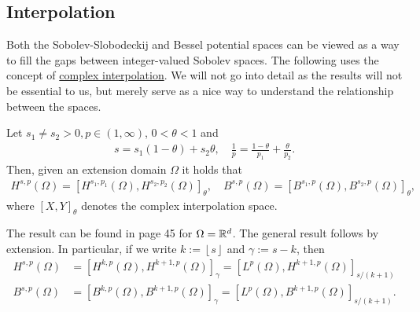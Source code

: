 \documentclass[
    a4paper,
    DIV=14,
    abstract=true,
    numbers=noenddot
]{scrartcl}
\begin{document}
\subsection{Interpolation}
Both the Sobolev-Slobodeckij and Bessel potential spaces can be viewed as a way to fill the gaps between integer-valued Sobolev spaces. The following uses the concept of \href{https://en.wikipedia.org/wiki/Interpolation_space}{complex interpolation}. We will not go into detail as the results will not be essential to us, but merely serve as a nice way to understand the relationship between the spaces.
\begin{proposition}[Interpolation ]\label{interpolation}
    Let $s_1 \neq s_2 >0, p \in (1, \infty)$, $0<\theta<1$ and
    \begin{align*}
        s=s_1(1-\theta)+s_2 \theta, \quad \frac{1}{p}=\frac{1-\theta}{p_1}+\frac{\theta}{p_2}.
    \end{align*}
    Then, given an extension domain $\Omega$  it holds that
    \begin{align*}
        H^{s,p}(\Omega )=\left[H^{s_1,p_1}(\Omega), H^{s_2,p_2}(\Omega)\right]_{\theta},\quad B^{s,p}(\Omega )=\left[B^{s_1,p}(\Omega ), B^{s_2, p}(\Omega )\right]_\theta,
    \end{align*}
    where $[X,Y]_\theta$ denotes the complex interpolation space.
\end{proposition}
The result can be found in \cite{triebel1992theory} page 45 for $\Omega = \mathbb{R}^d$. The general result follows by extension. In particular, if we write $k:=\left\lfloor s \right\rfloor$ and $\gamma:=s-k$, then
\begin{align*}
    H^{s,p}(\Omega ) & =\left[H^{k,p}(\Omega), H^{k+1,p}(\Omega)\right]_{\gamma }= \left[L^p(\Omega ), H^{k+1,p}(\Omega)\right]_{s/(k+1) }  \\
    B^{s,p}(\Omega ) & =\left[B^{k,p}(\Omega), B^{k+1,p}(\Omega)\right]_{\gamma }= \left[L^p(\Omega ), B^{k+1,p}(\Omega)\right]_{s/(k+1) }.
\end{align*}
\end{document}
